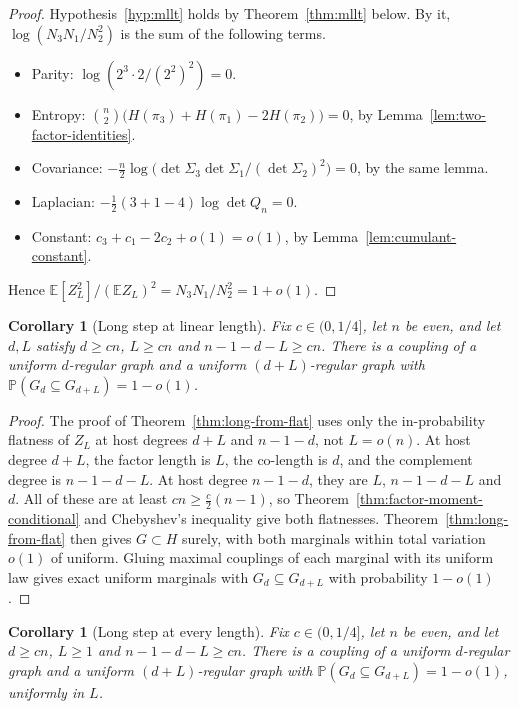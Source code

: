 \documentclass[11pt]{article}
\newtheorem{corollary}[theorem]{Corollary}
\newcommand{\EE}{\mathbb{E}}
\newcommand{\PP}{\mathbb{P}}
\begin{document}
\begin{proof}
Hypothesis~\ref{hyp:mllt} holds by Theorem~\ref{thm:mllt} below. By it,
\(\log(N_3N_1/N_2^2)\) is the sum of the following terms.
\begin{itemize}
\item Parity: \(\log(2^3\cdot2/(2^2)^2)=0\).
\item Entropy: \(\binom n2\bigl(H(\pi_3)+H(\pi_1)-2H(\pi_2)\bigr)=0\), by
Lemma~\ref{lem:two-factor-identities}.
\item Covariance: \(-\frac n2\log\bigl(\det\Sigma_3\det\Sigma_1/(\det\Sigma_2)^2\bigr)=0\),
by the same lemma.
\item Laplacian: \(-\frac12(3+1-4)\log\det Q_n=0\).
\item Constant: \(c_3+c_1-2c_2+o(1)=o(1)\), by Lemma~\ref{lem:cumulant-constant}.
\end{itemize}
Hence \(\EE[Z_L^2]/(\EE Z_L)^2=N_3N_1/N_2^2=1+o(1)\).
\end{proof}

\begin{corollary}[Long step at linear length]
\label{cor:long-step-linear}
Fix \(c\in(0,1/4]\), let \(n\) be even, and let \(d,L\) satisfy \(d\ge cn\),
\(L\ge cn\) and \(n-1-d-L\ge cn\).
There is a coupling of a uniform \(d\)-regular graph and a uniform
\((d+L)\)-regular graph with \(\PP(G_d\subseteq G_{d+L})=1-o(1)\).
\end{corollary}

\begin{proof}
The proof of Theorem~\ref{thm:long-from-flat} uses only the in-probability
flatness of \(Z_L\) at host degrees \(d+L\) and \(n-1-d\), not \(L=o(n)\).
At host degree \(d+L\), the factor length is \(L\), the co-length is \(d\), and
the complement degree is \(n-1-d-L\). At host degree \(n-1-d\), they are \(L\),
\(n-1-d-L\) and \(d\).
All of these are at least \(cn\ge\frac c2(n-1)\), so
Theorem~\ref{thm:factor-moment-conditional} and Chebyshev's inequality give
both flatnesses.
Theorem~\ref{thm:long-from-flat} then gives \(G\subset H\) surely, with both
marginals within total variation \(o(1)\) of uniform.
Gluing maximal couplings of each marginal with its uniform law gives exact
uniform marginals with \(G_d\subseteq G_{d+L}\) with probability \(1-o(1)\).
\end{proof}

\begin{corollary}[Long step at every length]
\label{cor:long-step-all}
Fix \(c\in(0,1/4]\), let \(n\) be even, and let \(d\ge cn\), \(L\ge1\) and
\(n-1-d-L\ge cn\).
There is a coupling of a uniform \(d\)-regular graph and a uniform
\((d+L)\)-regular graph with \(\PP(G_d\subseteq G_{d+L})=1-o(1)\), uniformly
in \(L\).
\end{corollary}
\end{document}
